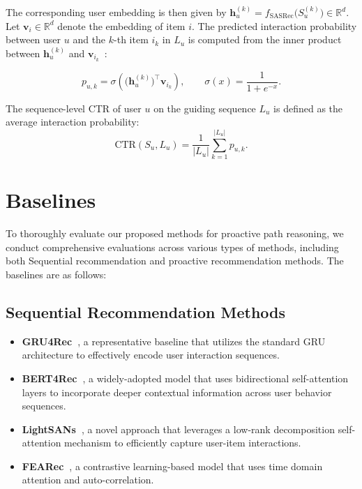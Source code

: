 \documentclass{llmxive}
\begin{document}
The corresponding user embedding is then given by $\mathbf{h}_u^{(k)} = f_{\mathrm{SASRec}}\bigl(S_u^{(k)}\bigr) \in \mathbb{R}^d.$ Let $\mathbf{v}_i \in \mathbb{R}^d$ denote the embedding of item $i$. The predicted interaction probability between user $u$ and the $k$-th item $i_k$ in $L_u$ is computed from the inner product between $\mathbf{h}_u^{(k)}$ and $\mathbf{v}_{i_k}$~\cite{bi2024proactive,lian2025itmprec}:

\begin{equation}
p_{u,k}
=
\sigma\!\left(
\bigl(\mathbf{h}_u^{(k)}\bigr)^\top \mathbf{v}_{i_k}
\right),
\qquad
\sigma(x) = \frac{1}{1 + e^{-x}}.
\end{equation}

The sequence-level CTR of user $u$ on the guiding sequence $L_u$
is defined as the average interaction probability:
\begin{equation}
\mathrm{CTR}(S_u, L_u)
=
\frac{1}{|L_u|}
\sum_{k=1}^{|L_u|}
p_{u,k}.
\end{equation}


\section{Baselines}
\label{app:baselines}

To thoroughly evaluate our proposed methods for proactive path reasoning, we conduct comprehensive evaluations across various types of methods, including both Sequential recommendation and proactive recommendation methods. The baselines are as follows:

\subsection{Sequential Recommendation Methods}

\begin{itemize}
    \item \textbf{GRU4Rec~\cite{hidasi2015session}}, a representative baseline that utilizes the standard GRU architecture to effectively encode user interaction sequences.
    \item \textbf{BERT4Rec~\cite{sun2019bert4rec}}, a widely-adopted model that uses bidirectional self-attention layers to incorporate deeper contextual information across user behavior sequences.
    \item \textbf{LightSANs~\cite{fan2021lighter}}, a novel approach that leverages a low-rank decomposition self-attention mechanism to efficiently capture user-item interactions.
    \item \textbf{FEARec~\cite{du2023frequency}}, a contrastive learning-based model that uses time domain attention and auto-correlation.
\end{itemize}
\end{document}

